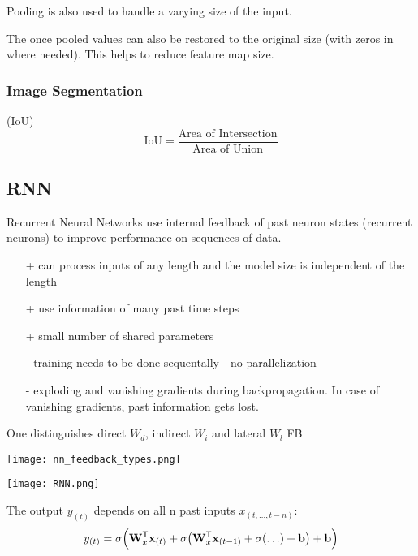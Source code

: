 Pooling is also used to handle a varying size of the input.

\newpar{}

The once pooled values can also be restored to the original size (with zeros in where needed). This helps to reduce feature map size.

\subsubsection{Image Segmentation}

 (IoU)
\begin{equation*}
    \text{IoU} = \frac{\text{Area of Intersection}}{\text{Area of Union}}
\end{equation*}


\subsection{RNN}\label{sec:RNN}
Recurrent Neural Networks use internal feedback of past neuron states (recurrent neurons) to improve performance on sequences of data.
\begin{itemize}
    \item[+] can process inputs of any length and the model size is independent of the length
    \item[+] use information of many past time steps
    \item[+] small number of shared parameters
    \item[-] training needs to be done sequentally - no parallelization
    \item[-] exploding and vanishing gradients during backpropagation. In case of vanishing gradients, past information gets lost.
\end{itemize}
\newpar{}

One distinguishes direct $W_d$, indirect $W_i$ and lateral $W_l$ FB
\begin{center}
    \texttt{[image: nn\_feedback\_types.png]}
\end{center}
\newpar{}
\begin{center}
    \texttt{[image: RNN.png]}
\end{center}
The output $y_{(t)}$ depends on all n past inputs $x_{(t,\ldots,t-n)}$:
\noindent\begin{equation*}
    y_{(t)} = \sigma\Bigl(\mathbf{W}_x^{\mathsf{T}}\mathbf{x}_{(t)} + \sigma\bigl(\mathbf{W}_x^{\mathsf{T}}\mathbf{x}_{(t-1)} + \sigma( \ldots ) + \mathbf{b}\bigr) + \mathbf{b}\Bigr)
\end{equation*}

